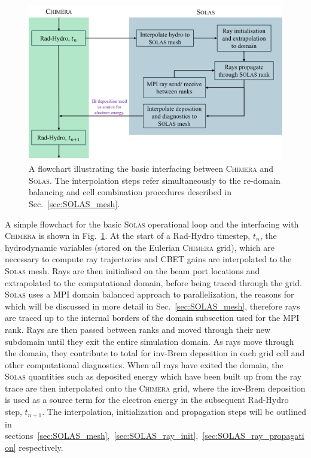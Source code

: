 \begin{figure}[t!]
    \includegraphics[width=0.9\linewidth]{Numerics/Images/raytrace_flowchart.png}
    \centering
    \caption{A flowchart illustrating the basic interfacing between \textsc{Chimera} and \textsc{Solas}.
    The interpolation steps refer simultaneously to the re-domain balancing and cell combination procedures described in Sec.~\ref{sec:SOLAS_mesh}.}%
    \label{fig:raytrace_flowchart}
\end{figure}

A simple flowchart for the basic \textsc{Solas} operational loop and the interfacing with \textsc{Chimera} is shown in Fig.~\ref{fig:raytrace_flowchart}.
At the start of a \ac{Rad-Hydro} timestep, $t_n$, the hydrodynamic variables (stored on the Eulerian \textsc{Chimera} grid), which are necessary to compute ray trajectories and \ac{CBET} gains are interpolated to the \textsc{Solas} mesh.
Rays are then initialised on the beam port locations and extrapolated to the computational domain, before being traced through the grid.
\textsc{Solas} uses a \ac{MPI} domain balanced approach to parallelization, the reasons for which will be discussed in more detail in Sec.~\ref{sec:SOLAS_mesh}, therefore rays are traced up to the internal borders of the domain subsection used for the \ac{MPI} rank.
Rays are then passed between ranks and moved through their new subdomain until they exit the entire simulation domain.
As rays move through the domain, they contribute to total for \ac{inv-Brem} deposition in each grid cell and other computational diagnostics.
When all rays have exited the domain, the \textsc{Solas} quantities such as deposited energy which have been built up from the ray trace are then interpolated onto the \textsc{Chimera} grid, where the \ac{inv-Brem} deposition is used as a source term for the electron energy in the subsequent \ac{Rad-Hydro} step, $t_{n+1}$.
The interpolation, initialization and propagation steps will be outlined in sections~\ref{sec:SOLAS_mesh},~\ref{sec:SOLAS_ray_init},~\ref{sec:SOLAS_ray_propagation} respectively.


